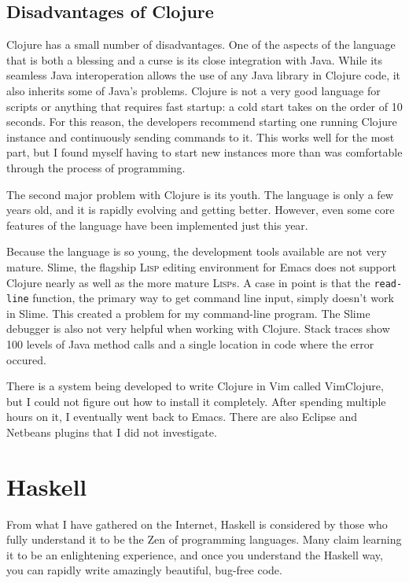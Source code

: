 \documentclass{article}
\begin{document}
\subsection{Disadvantages of Clojure}

Clojure has a small number of disadvantages.  One of the aspects of the language
that is both a blessing and a curse is its close integration with Java.  While
its seamless Java interoperation allows the use of any Java library in Clojure
code, it also inherits some of Java's problems.  Clojure is not a very good
language for scripts or anything that requires fast startup: a cold start takes
on the order of 10 seconds.  For this reason, the developers recommend starting
one running Clojure instance and continuously sending commands to it.  This
works well for the most part, but I found myself having to start new instances
more than was comfortable through the process of programming.

The second major problem with Clojure is its youth.  The language is only
a few years old, and it is rapidly evolving and getting better.  However, even
some core features of the language have been implemented just this year.

Because the language is so young, the development tools available are not very
mature.  Slime, the flagship \textsc{Lisp} editing environment for Emacs does
not support Clojure nearly as well as the more mature \textsc{Lisp}s.  A case in
point is that the \texttt{read-line} function, the primary way to get command
line input, simply doesn't work in Slime.  This created a problem for my
command-line program.  The Slime debugger is also not very helpful when working
with Clojure.  Stack traces show 100 levels of Java method calls and a single
location in code where the error occured.

There is a system being developed to write Clojure in Vim called VimClojure, but
I could not figure out how to install it completely.  After spending multiple
hours on it, I eventually went back to Emacs.  There are also Eclipse and
Netbeans plugins that I did not investigate.

\section{Haskell}

From what I have gathered on the Internet, Haskell is considered by those who
fully understand it to be the Zen of programming languages.  Many claim learning
it to be an enlightening experience, and once you understand the Haskell way,
you can rapidly write amazingly beautiful, bug-free code.
\end{document}
